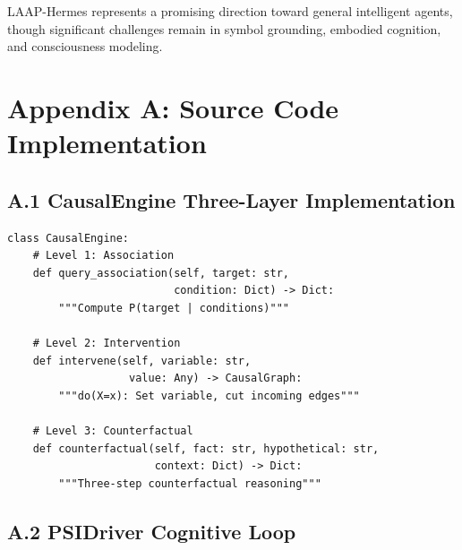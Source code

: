 \documentclass[10pt,twocolumn,letterpaper]{article}
\begin{document}
LAAP-Hermes represents a promising direction toward general intelligent agents, though significant challenges remain in symbol grounding, embodied cognition, and consciousness modeling.

\small



% 
% 
% 

\newpage
\section*{Appendix A: Source Code Implementation}

\subsection*{A.1 CausalEngine Three-Layer Implementation}

\begin{verbatim}
class CausalEngine:
    # Level 1: Association
    def query_association(self, target: str, 
                          condition: Dict) -> Dict:
        """Compute P(target | conditions)"""
        
    # Level 2: Intervention  
    def intervene(self, variable: str, 
                   value: Any) -> CausalGraph:
        """do(X=x): Set variable, cut incoming edges"""
        
    # Level 3: Counterfactual
    def counterfactual(self, fact: str, hypothetical: str,
                       context: Dict) -> Dict:
        """Three-step counterfactual reasoning"""
\end{verbatim}

\subsection*{A.2 PSIDriver Cognitive Loop}
\end{document}
